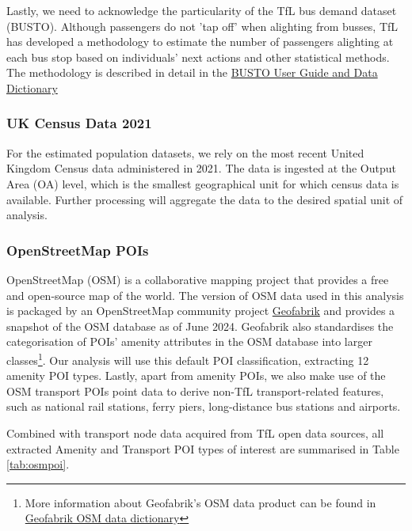 Lastly, we need to acknowledge the particularity of the TfL bus demand dataset (BUSTO). Although passengers do not 'tap off' when alighting from busses, TfL has developed a methodology to estimate the number of passengers alighting at each bus stop based on individuals' next actions and other statistical methods. The methodology is described in detail in the \href{http://crowding.data.tfl.gov.uk/BUSTO/BUSTO\%20User\%20Guide\%20and\%20Data\%20Dictionary\%20v1.0.pdf}{BUSTO User Guide and Data Dictionary}

\subsubsection*{UK Census Data 2021}
For the estimated population datasets, we rely on the most recent United Kingdom Census data administered in 2021. The data is ingested at the Output Area (OA) level, which is the smallest geographical unit for which census data is available. Further processing will aggregate the data to the desired spatial unit of analysis.

\subsubsection*{OpenStreetMap POIs}
OpenStreetMap (OSM) is a collaborative mapping project that provides a free and open-source map of the world. The version of OSM data used in this analysis is packaged by an OpenStreetMap community project \href{https://www.geofabrik.de/en/geofabrik/openstreetmap.html}{Geofabrik} and provides a snapshot of the OSM database as of June 2024. Geofabrik also standardises the categorisation of POIs' amenity attributes in the OSM database into larger classes\footnote{More information about Geofabrik's OSM data product can be found in \href{https://www.geofabrik.de/data/geofabrik-osm-gis-standard-0.6.pdf}{Geofabrik OSM data dictionary}}. Our analysis will use this default POI classification, extracting 12 amenity POI types. Lastly, apart from amenity POIs, we also make use of the OSM transport POIs point data to derive non-TfL transport-related features, such as national rail stations, ferry piers, long-distance bus stations and airports. 

Combined with transport node data acquired from TfL open data sources, all extracted Amenity and Transport POI types of interest are summarised in Table \ref{tab:osmpoi}.

